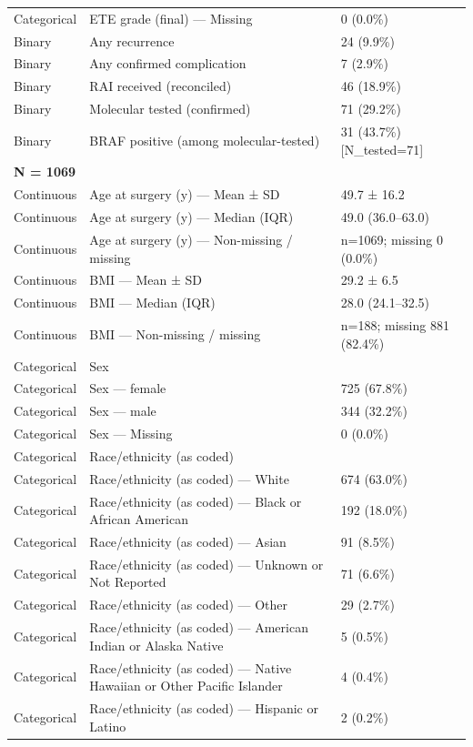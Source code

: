 \begin{table}[htbp]
\begin{tabular}{lll}
Categorical & ETE grade (final) — Missing & 0 (0.0\%) \\
Binary & Any recurrence & 24 (9.9\%) \\
Binary & Any confirmed complication & 7 (2.9\%) \\
Binary & RAI received (reconciled) & 46 (18.9\%) \\
Binary & Molecular tested (confirmed) & 71 (29.2\%) \\
Binary & BRAF positive (among molecular-tested) & 31 (43.7\%) [N\_tested=71] \\
\multicolumn{3}{l}{\textbf{N = 1069}} \\
Continuous & Age at surgery (y) — Mean ± SD & 49.7 ± 16.2 \\
Continuous & Age at surgery (y) — Median (IQR) & 49.0 (36.0–63.0) \\
Continuous & Age at surgery (y) — Non-missing / missing & n=1069; missing 0 (0.0\%) \\
Continuous & BMI — Mean ± SD & 29.2 ± 6.5 \\
Continuous & BMI — Median (IQR) & 28.0 (24.1–32.5) \\
Continuous & BMI — Non-missing / missing & n=188; missing 881 (82.4\%) \\
Categorical & Sex &  \\
Categorical & Sex — female & 725 (67.8\%) \\
Categorical & Sex — male & 344 (32.2\%) \\
Categorical & Sex — Missing & 0 (0.0\%) \\
Categorical & Race/ethnicity (as coded) &  \\
Categorical & Race/ethnicity (as coded) — White & 674 (63.0\%) \\
Categorical & Race/ethnicity (as coded) — Black or African American & 192 (18.0\%) \\
Categorical & Race/ethnicity (as coded) — Asian & 91 (8.5\%) \\
Categorical & Race/ethnicity (as coded) — Unknown or Not Reported & 71 (6.6\%) \\
Categorical & Race/ethnicity (as coded) — Other & 29 (2.7\%) \\
Categorical & Race/ethnicity (as coded) — American Indian or Alaska Native & 5 (0.5\%) \\
Categorical & Race/ethnicity (as coded) — Native Hawaiian or Other Pacific Islander & 4 (0.4\%) \\
Categorical & Race/ethnicity (as coded) — Hispanic or Latino & 2 (0.2\%) \\

\end{tabular}
\end{table}
